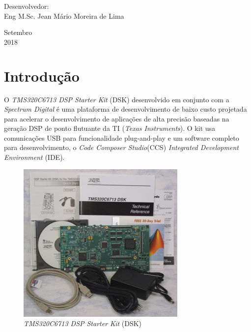 \documentclass[a4paper, 12pt]{article}
\begin{document}
\begin{titlepage}
	\vfill
	
	\begin{flushleft}
		\begin{tabbing}
			Desenvolvedor: \\
			Eng\textordmasculine{ } M.Sc. Jean Mário Moreira de Lima\\
	\end{tabbing}
 \end{flushleft}
	\vspace{1cm}
	
	\begin{center}
		\vspace{\fill}
			 Setembro\\
		 2018
			\end{center}
\end{titlepage}


\newpage
\tableofcontents
\thispagestyle{empty}

\newpage
{}
\section{Introdução}

O \textit{TMS320C6713 DSP Starter Kit} (DSK) desenvolvido em conjunto com a \textit{Spectrum Digital} é uma plataforma de desenvolvimento de baixo custo projetada para acelerar o desenvolvimento de aplicações de alta precisão baseadas na geração DSP de ponto flutuante da TI (\textit{Texas Instruments}). O kit usa comunicações USB para funcionalidade plug-and-play e um software completo para desenvolvimento, o \textit{Code Composer Studio}\texttrademark(CCS) \textit{Integrated Development Environment} (IDE).

\begin{figure}[htbp!] 
	\begin{center}
		\includegraphics[scale=2]{dsp_starter_kit.jpg}
		\caption{\textit{TMS320C6713 DSP Starter Kit} (DSK)}
		\label{Fig:dskdsp}
	\end{center} 
\end{figure}
\end{document}
